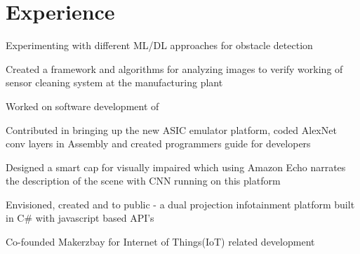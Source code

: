 \documentclass[]{resume-openfont}
\begin{document}
\begin{minipage}[t]{0.63\textwidth} 


\section{Experience}

\vspace{\topsep} %
\begin{tightemize}
\item Experimenting with different ML/DL approaches for obstacle detection
\item Created a framework and algorithms for analyzing images to verify working of sensor cleaning system at the manufacturing plant
\end{tightemize}
\sectionsep

\begin{tightemize}
\item  Worked on software development of  \href{https://developer.qualcomm.com/software/snapdragon-neural-processing-engine}{}
\item Contributed in bringing up the new ASIC emulator platform, coded AlexNet conv layers in Assembly and created programmers guide  for developers
\item Designed a smart cap for visually impaired which using Amazon Echo narrates the description of the scene with CNN running on this platform

\end{tightemize}
\sectionsep

\begin{tightemize}
\item Envisioned, created and \href{https://github.com/Microsoft/kinect-ripple}{} to public \href{https://www.youtube.com/watch?v=_0K4iZdMjLw}{} - a dual projection infotainment platform built in C\# with javascript based API's
\item Co-founded Makerzbay for Internet of Things(IoT) related development 
\end{tightemize}
\sectionsep


\end{minipage}
\end{document}
